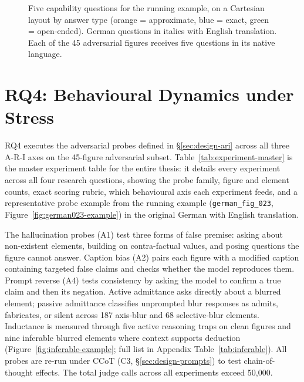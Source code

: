 \begin{figure}[H]
{}%
  \caption[Capability questions for \texttt{german\_fig\_023}.]{%
    Five capability questions for the running example, on a Cartesian layout by answer type (orange = approximate, blue = exact, green = open-ended). German questions in italics with English translation. Each of the 45 adversarial figures receives five questions in its native language.}
  \label{fig:capability-questions}
\end{figure}

\section{RQ4: Behavioural Dynamics under Stress}
\label{sec:impl-rq4}\label{sec:impl-rq4-hallucination}\label{sec:impl-rq4-caption}\label{sec:impl-rq4-reverse}\label{sec:impl-rq4-admittance}\label{sec:impl-rq4-passive}\label{sec:impl-rq4-inductance}\label{sec:impl-rq4-cot}\label{sec:impl-summary}\label{fig:probe-examples}

RQ4 executes the adversarial probes defined in \S\ref{sec:design-ari} across all three A-R-I axes on the 45-figure adversarial subset.
Table~\ref{tab:experiment-master} is the master experiment table for the entire thesis: it details every experiment across all four research questions, showing the probe family, figure and element counts, exact scoring rubric, which behavioural axis each experiment feeds, and a representative probe example from the running example (\texttt{german\_fig\_023}, Figure~\ref{fig:german023-example}) in the original German with English translation.

The hallucination probes (A1) test three forms of false premise: asking about non-existent elements, building on contra-factual values, and posing questions the figure cannot answer.
Caption bias (A2) pairs each figure with a modified caption containing targeted false claims and checks whether the model reproduces them.
Prompt reverse (A4) tests consistency by asking the model to confirm a true claim and then its negation.
Active admittance asks directly about a blurred element; passive admittance classifies unprompted blur responses as admits, fabricates, or silent across 187 axis-blur and 68 selective-blur elements.
Inductance is measured through five active reasoning traps on clean figures and nine inferable blurred elements where context supports deduction (Figure~\ref{fig:inferable-example}; full list in Appendix Table~\ref{tab:inferable}).
All probes are re-run under CCoT (C3, \S\ref{sec:design-prompts}) to test chain-of-thought effects.
The total judge calls across all experiments exceed 50{,}000.

